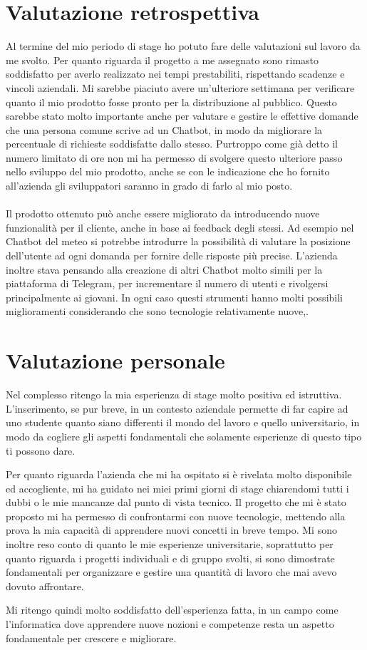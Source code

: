 \section{Valutazione retrospettiva}
Al termine del mio periodo di stage ho potuto fare delle valutazioni sul lavoro da me svolto. Per quanto riguarda il progetto a me assegnato sono rimasto soddisfatto per averlo realizzato nei tempi prestabiliti, rispettando scadenze e vincoli aziendali. Mi sarebbe piaciuto avere un'ulteriore settimana per verificare quanto il mio prodotto fosse pronto per la distribuzione al pubblico. Questo sarebbe stato molto importante anche per valutare e gestire le effettive domande che una persona comune scrive ad un \gls{Chatbot}, in modo da migliorare la percentuale di richieste soddisfatte dallo stesso. Purtroppo come già detto il numero limitato di ore non mi ha permesso di svolgere questo ulteriore passo nello sviluppo del mio prodotto, anche se con le indicazione che ho fornito all'azienda gli sviluppatori saranno in grado di farlo al mio posto.\\ \\
Il prodotto ottenuto può anche essere migliorato da \azienda{} introducendo nuove funzionalità per il cliente, anche in base ai feedback degli stessi. Ad esempio nel \gls{Chatbot} del meteo si potrebbe introdurre la possibilità di valutare la posizione dell'utente ad ogni domanda per fornire delle risposte più precise. L'azienda inoltre stava pensando alla creazione di altri \gls{Chatbot} molto simili per la piattaforma di Telegram, per incrementare il numero di utenti e rivolgersi principalmente ai giovani. In ogni caso questi strumenti hanno molti possibili miglioramenti considerando che sono tecnologie relativamente nuove,.

\section{Valutazione personale}
Nel complesso ritengo la mia esperienza di stage molto positiva ed istruttiva. L'inserimento, se pur breve, in un contesto aziendale permette di far capire ad uno studente quanto siano differenti il mondo del lavoro e quello universitario, in modo da cogliere gli aspetti fondamentali che solamente esperienze di questo tipo ti possono dare.

Per quanto riguarda l'azienda che mi ha ospitato si è rivelata molto disponibile ed accogliente, mi ha guidato nei miei primi giorni di stage chiarendomi tutti i dubbi o le mie mancanze dal punto di vista tecnico. Il progetto che mi è stato proposto mi ha permesso di confrontarmi con nuove tecnologie, mettendo alla prova la mia capacità di apprendere nuovi concetti in breve tempo. Mi sono inoltre reso conto di quanto le mie esperienze universitarie, soprattutto per quanto riguarda i progetti individuali e di gruppo svolti, si sono dimostrate fondamentali per organizzare e gestire una quantità di lavoro che mai avevo dovuto affrontare.

Mi ritengo quindi molto soddisfatto dell'esperienza fatta, in un campo come l'informatica dove apprendere nuove nozioni e competenze resta un aspetto fondamentale per crescere e migliorare. 
